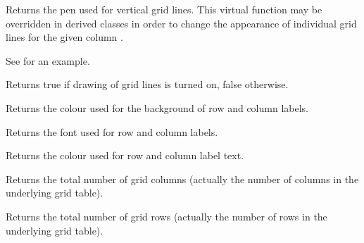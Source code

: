 \label{wxgridgetcolgridlinepen}


Returns the pen used for vertical grid lines. This virtual function may be
overridden in derived classes in order to change the appearance of individual
grid lines for the given column .

See  for an example.




\label{wxgridgridlinesenabled}


Returns true if drawing of grid lines is turned on, false otherwise.



\label{wxgridgetlabelbackgroundcolour}


Returns the colour used for the background of row and column labels.



\label{wxgridgetlabelfont}


Returns the font used for row and column labels.



\label{wxgridgetlabeltextcolour}


Returns the colour used for row and column label text.



\label{wxgridgetnumbercols}


Returns the total number of grid columns (actually the number of columns in the underlying grid
table).



\label{wxgridgetnumberrows}


Returns the total number of grid rows (actually the number of rows in the underlying grid table).



